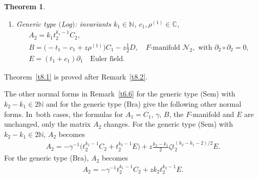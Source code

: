 \documentclass[pdftex]{sigma}%
\numberwithin{equation}{section}
\numberwithin{figure}{section}
\newcommand{\N}{{\mathbb N}}
\newcommand{\C}{{\mathbb C}}
\newcommand{\NN}{{\mathcal N}}
\newcommand{\paa}{\partial}
\newtheorem{Theorem}{Theorem}[section]
\begin{document}
\begin{Theorem}
\begin{enumerate}
\begin{enumerate}
\item[$(iv)$] Generic type $($Log$)$:
invariants $k_1\in\N$,
$c_1,\rho^{(1)}\in\C$,
\begin{gather*}%
A_2=k_1t_2^{k_1-1}C_2,
\\
B= \big({-}t_1-c_1+z\rho^{(1)}\big)C_1-z\frac{1}{2} D,
\quad
\text{$F$-manifold }\NN_2,
\text{ with }\paa_2\circ\paa_2=0,\\
E= (t_1+c_1)\paa_1 \quad\text{Euler field}.
\end{gather*}
\end{enumerate}
\end{enumerate}
\end{Theorem}


Theorem~\ref{t8.1} is proved after Remark~\ref{t8.2}.

\begin{Remark}\label{t8.2}
The other normal forms in Remark~\ref{t6.6} for
the generic type (Sem) with $k_2-k_1\in 2\N$ and for the
generic type (Bra) give the following other normal
forms. In~both cases, the formulas for $A_1=C_1$,
$\gamma$, $B$, the $F$-manifold and $E$ are unchanged,
only the matrix $A_2$ changes.
For the generic type (Sem) with $k_2-k_1\in 2\N$, $A_2$ becomes
\begin{gather*}%
A_2=-\gamma^{-1}\big(t_2^{k_1-1}C_2+t_2^{k_2-1}E\big) +
z\frac{k_2-k_1}{2}\zeta t_2^{(k_2-k_1-2)/2}E.
\end{gather*}
For the generic type (Bra), $A_2$ becomes
\begin{gather*}%
A_2=-\gamma^{-1}t_2^{k_1-1}C_2+zk_2t_2^{k_2-1}E .
\end{gather*}
\end{Remark}
\end{document}
